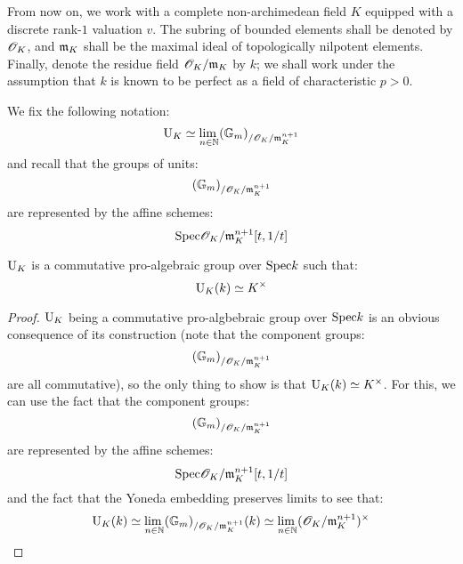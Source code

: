                 \begin{convention}
                    From now on, we work with a complete non-archimedean field $K$ equipped with a discrete rank-$1$ valuation $v$. The subring of bounded elements shall be denoted by $\mathscr{O}_K$, and $\mathfrak{m}_K$ shall be the maximal ideal of topologically nilpotent elements. Finally, denote the residue field $\mathscr{O}_K/\mathfrak{m}_K$ by $k$; we shall work under the assumption that $k$ is known to be perfect as a field of characteristic $p > 0$.
                \end{convention}
                \begin{convention}
                    We fix the following notation:
                        $$\mathrm{U}_K \simeq \underset{n \in \mathbb{N}}{\operatorname{lim} \:} (\mathbb{G}_m)_{/\mathscr{O}_K/\mathfrak{m}_K^{n + 1}}$$
                    and recall that the groups of units:
                        $$(\mathbb{G}_m)_{/\mathscr{O}_K/\mathfrak{m}_K^{n + 1}}$$
                    are represented by the affine schemes:
                        $$\mathrm{Spec} \mathscr{O}_K/\mathfrak{m}_K^{n + 1}[t, 1/t]$$
                \end{convention}
                \begin{proposition}[Properties of $\U_K$] \label{prop: properties_of_the_pro_algebraic_group_of_units}
                    $\U_K$ is a commutative pro-algebraic group over $\mathrm{Spec} k$ such that:
                        $$\U_K(k) \cong K^{\x}$$
                \end{proposition}
                    \begin{proof}
                        $\U_K$ being a commutative pro-algbebraic group over $\mathrm{Spec} k$ is an obvious consequence of its construction (note that the component groups:
                            $$(\mathbb{G}_m)_{/\mathscr{O}_K/\mathfrak{m}_K^{n + 1}}$$
                        are all commutative), so the only thing to show is that $\U_K(k) \cong K^{\x}$. For this, we can use the fact that the component groups:
                            $$(\mathbb{G}_m)_{/\mathscr{O}_K/\mathfrak{m}_K^{n + 1}}$$
                        are represented by the affine schemes:
                            $$\mathrm{Spec} \mathscr{O}_K/\mathfrak{m}_K^{n + 1}[t, 1/t]$$
                        and the fact that the Yoneda embedding preserves limits to see that:
                            $$\U_K(k) \cong \underset{n \in \N}{\lim} (\G_m)_{/\scrO_K/\m_K^{n + 1}}(k) \cong \underset{n \in \N}{\lim} (\scrO_K/\m_K^{n + 1})^{\x}$$
                    \end{proof}
            
